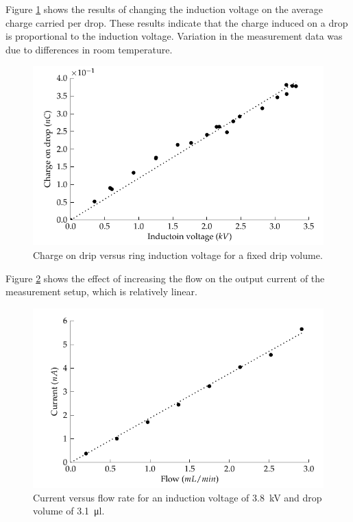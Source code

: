 Figure \ref{Figure_Graph_dripper_chargeVsVoltage} shows the results
of changing the induction voltage on the average charge carried per
drop. These results indicate that the charge induced on a drop is
proportional to the induction voltage. Variation in the measurement
data was due to differences in room temperature.

\begin{figure}
    \includegraphics{content/appendices/chargedWaterDrops/graphics/dripper_chargeVsVoltage}
    \caption{\label{Figure_Graph_dripper_chargeVsVoltage}Charge on drip versus ring induction voltage for a fixed drip volume.}
\end{figure}


Figure \ref{Figure_Graph_dripper_currentVsFlow} shows the effect
of increasing the flow on the output current of the measurement setup,
which is relatively linear.

\begin{figure}
    \centering
    \includegraphics{content/appendices/chargedWaterDrops/graphics/dripper_currentVsFlow}
    \caption{\label{Figure_Graph_dripper_currentVsFlow}Current versus flow rate
    for an induction voltage of \SI{3.8}{\kilo\volt} and drop volume of \SI{3.1}{\micro\litre}.}
\end{figure}



